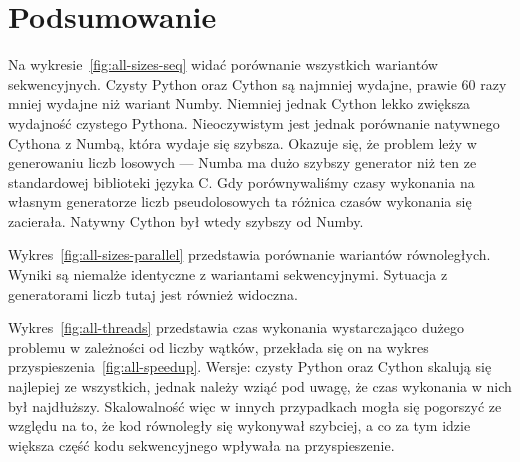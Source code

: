 \begin{figure*}
    \centering
    
    \caption{Czas wykonania algorytmu w zależności od rozmiaru problemu}
    \label{fig:all-sizes-seq}
\end{figure*}


\begin{figure*}
    \centering
    
    \caption{Czas wykonania algorytmu w zależności od rozmiaru problemu}
    \label{fig:all-sizes-parallel}
\end{figure*}

\begin{figure*}
    \centering
    \begin{minipage}[b]{.45\textwidth}
        \centering
        
        \caption{Czas wykonania algorytmu w zależności od liczby wątków}
        \label{fig:all-threads}
    \end{minipage}
    \hfill
    \begin{minipage}[b]{.45\textwidth}
        \centering
        
        \caption{Przyspieszenie liczenia liczby $\pi$}
        \label{fig:all-speedup}
    \end{minipage}
\end{figure*}

\section{Podsumowanie}

Na wykresie~\ref{fig:all-sizes-seq} widać porównanie
wszystkich wariantów sekwencyjnych.
Czysty Python oraz Cython są najmniej wydajne,
prawie 60 razy mniej wydajne niż wariant Numby.
Niemniej jednak Cython lekko zwiększa wydajność czystego Pythona.
Nieoczywistym jest jednak porównanie natywnego Cythona z Numbą,
która wydaje się szybsza.
Okazuje się, że problem leży w generowaniu liczb losowych ---
Numba ma dużo szybszy generator niż ten ze standardowej biblioteki
języka C\@.
Gdy porównywaliśmy czasy wykonania na własnym generatorze liczb pseudolosowych
ta różnica czasów wykonania się zacierała.
Natywny Cython był wtedy szybszy od Numby.

Wykres~\ref{fig:all-sizes-parallel} przedstawia porównanie wariantów równoległych.
Wyniki są niemalże identyczne z wariantami sekwencyjnymi.
Sytuacja z generatorami liczb tutaj jest również widoczna.

Wykres~\ref{fig:all-threads} przedstawia czas wykonania wystarczająco dużego problemu
w zależności od liczby wątków,
przekłada się on na wykres przyspieszenia~\ref{fig:all-speedup}.
Wersje: czysty Python oraz Cython skalują się najlepiej ze wszystkich,
jednak należy wziąć pod uwagę, że czas wykonania w nich był najdłuższy.
Skalowalność więc w innych przypadkach mogła się pogorszyć ze względu na to,
że kod równoległy się wykonywał szybciej, a co za tym idzie większa
część kodu sekwencyjnego wpływała na przyspieszenie.

